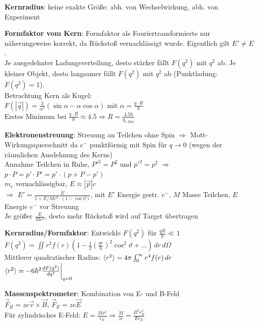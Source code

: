 \documentclass[10pt,twoside,a4paper]{article}
\begin{document}
\begin{multicols*}{3}
\textbf{Kernradius}: keine exakte Größe: abh. von Wechselwirkung, abh. von Experiment

\textbf{Formfaktor vom Kern}: Formfaktor als Fouriertransformierte nur näherungsweise korrekt, da Rückstoß vernachlässigt wurde. Eigentlich gilt $E' \neq E$. \\
Je ausgedehnter Ladungsverteilung, desto stärker fällt $F(q^2)$ mit $q^2$ ab. Je kleiner Objekt, desto langsamer fällt $F(q^2)$ mit $q^2$ ab (Punktladung: $F(q^2) = 1$). \\
Betrachtung Kern als Kugel: \\
$F\left( \left| \vec{q} \right| \right) = \frac{3}{\alpha^3} (\sin \alpha - \alpha \cos \alpha)$ mit $\alpha = \frac{q \cdot R}{\hbar}$ \\
Erstes Minimum bei $\frac{q \cdot R}{\hbar} \approx 4.5 \Rightarrow R = \frac{4.5 \hbar}{q_{1.Min}}$

\textbf{Elektronenstreuung}: Streuung an Teilchen ohne Spin $\Rightarrow$ Mott-Wirkungsquerschnitt da $e^-$ punktförmig mit Spin für $q \to 0$ (wegen der räumlichen Ausdehnung des Kerns) \\
Annahme Teilchen in Ruhe, $P'^2 = P^2$ und $p'^2 = p^2$ $\Rightarrow$ $p \cdot P = p' \cdot P' = p' \cdot (p + P - p')$ \\
$m_e$ vernachlässigbar, $E \approx \left| \vec{p} \right| c$ \\
$\Rightarrow$ $E' = \frac{E}{1 + E/Mc^2 \cdot (1 - \cos \vartheta)}$, mit $E'$ Energie gestr. $e^-$, $M$ Masse Teilchen, $E$ Energie $e^-$ vor Streuung \\
Je größer $\frac{E}{Mc^2}$, desto mehr Rückstoß wird auf Target übertragen

\textbf{Kernradius/Formfaktor}: Entwickle $F(q^2)$ für $\frac{qR}{\hbar} \ll 1$ \\
$F(q^2) = \iint r^2 f(r) \left( 1 - \frac{1}{2} \left( \frac{qr}{\hbar} \right)^2 \cos^2 \vartheta + ... \right) \,dr \,d\Omega$ \\
Mittlerer quadratischer Radius: $\braket{r^2} = 4\pi \int_0^{\infty} r^4 f(r) \,dr$ \\
$\braket{r^2} = -6\hbar^2 \frac{dF(q^2)}{dq^2}\bigg|_{q=0}$

\textbf{Massenspektrometer}: Kombination von E- und B-Feld \\
$\vec{F}_B = z e \vec{v} \times \vec{B}$, $\vec{F}_E = z e \vec{E}$ \\
Für zylindrisches E-Feld: $E = \frac{Mv^2}{r_E} \Rightarrow \frac{M}{z e} = \frac{B^2 r^2_B}{E r_E}$


\end{multicols*}
\end{document}
